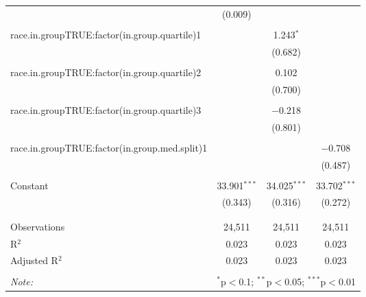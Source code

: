 \begin{table}[!htbp]
\begin{tabular}{@{\extracolsep{5pt}}lccc}
  & (0.009) &  &  \\ 
  & & & \\ 
 race.in.groupTRUE:factor(in.group.quartile)1 &  & 1.243$^{*}$ &  \\ 
  &  & (0.682) &  \\ 
  & & & \\ 
 race.in.groupTRUE:factor(in.group.quartile)2 &  & 0.102 &  \\ 
  &  & (0.700) &  \\ 
  & & & \\ 
 race.in.groupTRUE:factor(in.group.quartile)3 &  & $-$0.218 &  \\ 
  &  & (0.801) &  \\ 
  & & & \\ 
 race.in.groupTRUE:factor(in.group.med.split)1 &  &  & $-$0.708 \\ 
  &  &  & (0.487) \\ 
  & & & \\ 
 Constant & 33.901$^{***}$ & 34.025$^{***}$ & 33.702$^{***}$ \\ 
  & (0.343) & (0.316) & (0.272) \\ 
  & & & \\ 
\hline \\[-1.8ex] 
Observations & 24,511 & 24,511 & 24,511 \\ 
R$^{2}$ & 0.023 & 0.023 & 0.023 \\ 
Adjusted R$^{2}$ & 0.023 & 0.023 & 0.023 \\ 
\hline 
\hline \\[-1.8ex] 
\textit{Note:}  & \multicolumn{3}{r}{$^{*}$p$<$0.1; $^{**}$p$<$0.05; $^{***}$p$<$0.01} \\ 
\end{tabular} 
\end{table} 
